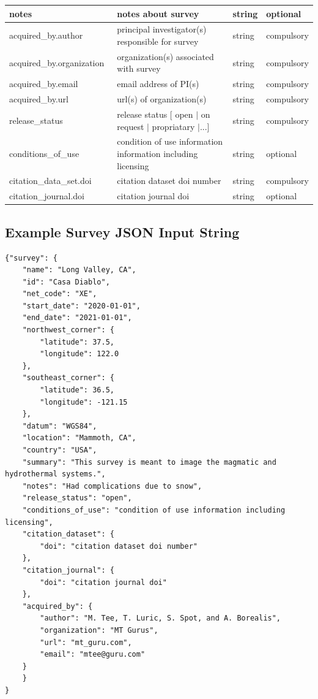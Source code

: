 \documentclass{article}
\begin{document}
\begin{table}[htb!]
\begin{tabular}{|l|p{3.65in}|l|l|}
		notes\ & notes about survey & string & optional \\ \hline
		acquired\_by.author\ & principal investigator(s) responsible for survey & string & compulsory \\ \hline
		acquired\_by.organization\ & organization(s) associated with survey & string & compulsory \\ \hline
		acquired\_by.email\ & email address of PI(s) & string & compulsory \\ \hline
		acquired\_by.url\ & url(s) of organization(s) & string & compulsory \\ \hline
		release\_status\ & release status [ open $|$ on request $|$ propriatary $|$...] & string & compulsory \\ \hline
		conditions\_of\_use\ & condition of use information information including licensing & string & optional \\ \hline
		citation\_data\_set.doi & citation dataset doi number & string & compulsory \\ \hline
		citation\_journal.doi & citation journal doi & string & optional \\ \hline
	\end{tabular}
	\label{tab:survey}
\end{table} 

\newpage
\subsection{Example Survey JSON Input String}

\begin{verbatim}
{"survey": {
    "name": "Long Valley, CA",
    "id": "Casa Diablo",
    "net_code": "XE",
    "start_date": "2020-01-01",
    "end_date": "2021-01-01",
    "northwest_corner": {
        "latitude": 37.5,
        "longitude": 122.0
    },
    "southeast_corner": {
        "latitude": 36.5,
        "longitude": -121.15
    },
    "datum": "WGS84",
    "location": "Mammoth, CA",
    "country": "USA",
    "summary": "This survey is meant to image the magmatic and hydrothermal systems.",
    "notes": "Had complications due to snow",
    "release_status": "open",
    "conditions_of_use": "condition of use information including licensing",
    "citation_dataset": {
        "doi": "citation dataset doi number"
    },
    "citation_journal": {
        "doi": "citation journal doi"
    },
    "acquired_by": {
        "author": "M. Tee, T. Luric, S. Spot, and A. Borealis",
        "organization": "MT Gurus",
        "url": "mt_guru.com",
        "email": "mtee@guru.com"
    }
    }
}
\end{verbatim}
\end{document}
